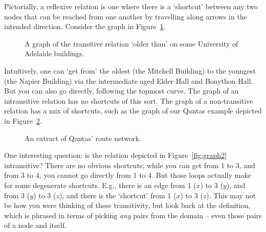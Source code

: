 Pictorially, a reflexive relation is one where there is a `shortcut' between any two nodes that can be reached from one another by travelling along arrows in the intended direction. Consider the graph in Figure~\ref{fig:trans}. 
\begin{figure}
	\caption{A graph of the transitive relation `older than' on some University of Adelaide buildings.\label{fig:trans}}
\end{figure} Intuitively, one can `get from' the oldest (the Mitchell Building) to the youngest (the Napier Building) via the intermediate aged Elder Hall and Bonython Hall. But you can also go directly, following the topmost curve. The graph of an intransitive relation has no shortcuts of this sort. The graph of a non-transitive relation has a mix of shortcuts, such as the graph of our Qantas example depicted in Figure~\ref{fig:qantas}. 
\begin{figure}[b]
	\caption{An extract of Qantas' route network.\label{fig:qantas}}
\end{figure}

One interesting question: is the relation depicted in Figure~\ref{fig:graph2} intransitive? There are no obvious shortcuts; while you can get from 1 to 3, and from 3 to 4, you cannot go directly from 1 to 4. But those loops actually make for some degenerate shortcuts. E.g., there is an edge from 1 ($x$) to 3 ($y$), and from 3 ($y$) to 3 ($z$), and there is the `shortcut' from 1 ($x$) to 3 ($z$). This may not be how you were thinking of these transitivity, but look back at the definition, which is phrased in terms of picking \emph{any} pairs from the domain – even those pairs of a node and itself. 

